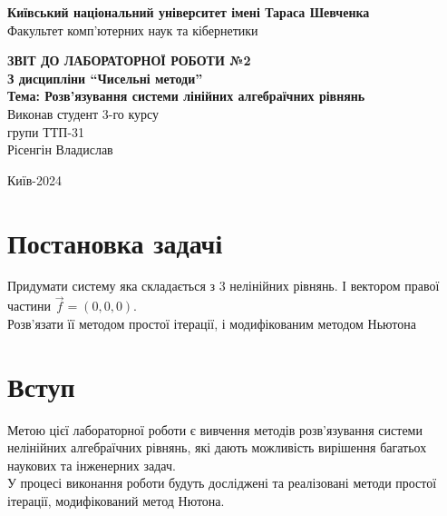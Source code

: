 \documentclass[a4paper, 12pt]{article}
\begin{document}
\begin{titlepage}
	\begin{center}
		\Large
		\textbf{Київський національний університет імені Тараса Шевченка} \\
		Факультет комп'ютерних наук та кібернетики \\

		\vspace{6cm}

		\textbf{\LARGE ЗВІТ ДО ЛАБОРАТОРНОЇ РОБОТИ №2} \\[0.5cm]
		\textbf{З дисципліни ``Чисельні методи''} \\[0.5cm]
		\textbf{Тема: Розв'язування системи лінійних алгебраїчних рівнянь} \\

		\vfill
		\hspace{7cm} Виконав студент 3-го курсу \\
		\hspace{7cm} групи ТТП-31 \\
		\hspace{7cm} Рісенгін Владислав \\
		\vspace{2cm}

		Київ-2024
	\end{center}
\end{titlepage}

\newpage


\section{Постановка задачі}

Придумати систему яка складається з 3 нелінійних рівнянь. І вектором правої частини $\vec f = (0, 0, 0)$. \\

Розв'язати її методом простої ітерації, і модифікованим методом Ньютона

\section{Вступ}

Метою цієї лабораторної роботи є вивчення методів розв'язування системи нелінійних алгебраїчних рівнянь, 
які дають можливість вирішення багатьох наукових та інженерних задач. \\

У процесі виконання роботи будуть досліджені та реалізовані методи простої ітерації, модифікований метод Нютона.
\end{document}
